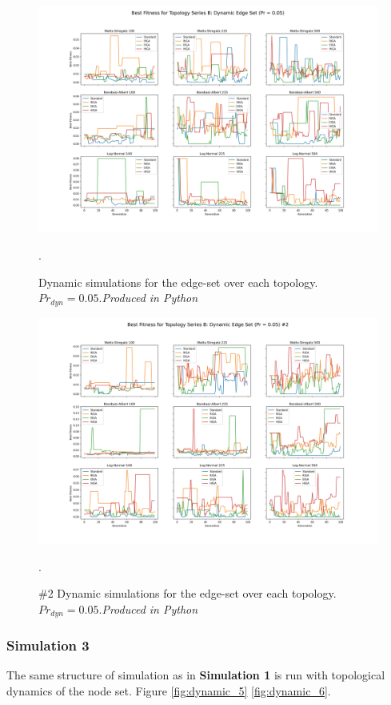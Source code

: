 \documentclass[
	a4paper, %
	10pt, %
	unnumberedsections, %
	twoside, %
]{LTJournalArticle}
\begin{document}
\begin{figure}
	\includegraphics[width=\linewidth]{Figures/sims/dynamic/series_b_edge.jpg}
	\caption{Dynamic simulations for the edge-set over each topology. \(Pr_{dyn} = 0.05\).\emph{Produced in Python}}. 
	\label{fig:dynamic_3}
\end{figure}

\begin{figure}
	\includegraphics[width=\linewidth]{Figures/sims/dynamic/series_b_edge_2.jpg}
	\caption{\#2 Dynamic simulations for the edge-set over each topology. \(Pr_{dyn} = 0.05\).\emph{Produced in Python}}. 
	\label{fig:dynamic_4}
\end{figure}

\subsubsection{Simulation 3} The same structure of simulation as in \textbf{Simulation 1} is run with topological dynamics of the node set. Figure \ref{fig:dynamic_5} \ref{fig:dynamic_6}.
\end{document}

